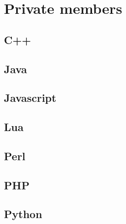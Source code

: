 \documentclass{KodeBook}
\begin{document}
\section{Private members}

\subsection{C++}

%

\subsection{Java}

%

\subsection{Javascript} 

%
%
%


\subsection{Lua}


\subsection{Perl}

%

\subsection{PHP}

%

\subsection{Python}
\end{document}
